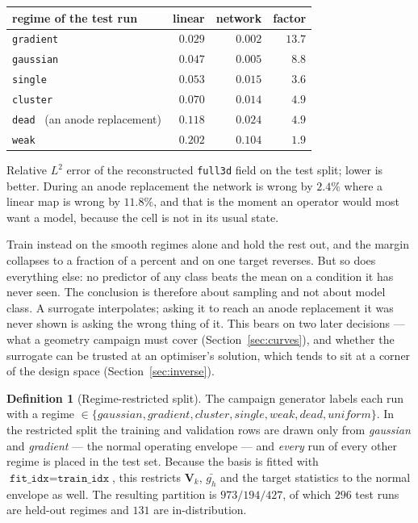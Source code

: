 \documentclass[11pt,a4paper]{article}
\newcommand{\vect}[1]{\mathbf{#1}}
\theoremstyle{plain}
\theoremstyle{definition}
\newtheorem{definition}[proposition]{Definition}
\theoremstyle{remark}
\begin{document}
\begin{center}
\small
\begin{tabular}{@{}lrrr@{}}
\toprule
regime of the test run & linear & network & factor \\
\midrule
\texttt{gradient}                     & $0.029$ & $0.002$ & $13.7$ \\
\texttt{gaussian}                     & $0.047$ & $0.005$ & $8.8$ \\
\texttt{single}                       & $0.053$ & $0.015$ & $3.6$ \\
\texttt{cluster}                      & $0.070$ & $0.014$ & $4.9$ \\
\texttt{dead} \ (an anode replacement) & $0.118$ & $0.024$ & $4.9$ \\
\texttt{weak}                         & $0.202$ & $0.104$ & $1.9$ \\
\bottomrule
\end{tabular}
\end{center}

\noindent
Relative $L^2$ error of the reconstructed \texttt{full3d} field on the test
split; lower is better. During an anode replacement the network is wrong by
$2.4\%$ where a linear map is wrong by $11.8\%$, and that is the moment an
operator would most want a model, because the cell is not in its usual state.

Train instead on the smooth regimes alone and hold the rest out, and the margin
collapses to a fraction of a percent and on one target reverses. But so does
everything else: no predictor of any class beats the mean on a condition it has
never seen. The conclusion is therefore about sampling and not about model
class. A surrogate interpolates; asking it to reach an anode replacement it was
never shown is asking the wrong thing of it. This bears on two later decisions
--- what a geometry campaign must cover (Section~\ref{sec:curves}), and whether
the surrogate can be trusted at an optimiser's solution, which tends to sit at a
corner of the design space (Section~\ref{sec:inverse}).

\begin{definition}[Regime-restricted split]
\label{def:restricted}
The campaign generator labels each run with a regime
$\in\{\textit{gaussian},\textit{gradient},\textit{cluster},\textit{single},
\textit{weak},\textit{dead},\textit{uniform}\}$. In the restricted split the
training and validation rows are drawn only from \textit{gaussian} and
\textit{gradient} --- the normal operating envelope --- and \emph{every} run of
every other regime is placed in the test set. Because the basis is fitted with
$\texttt{fit\_idx}=\texttt{train\_idx}$, this restricts $\vect{V}_k$,
$\bar{g_h}$ and the target statistics to the normal envelope as well. The
resulting partition is $973/194/427$, of which $296$ test runs are held-out
regimes and $131$ are in-distribution.
\end{definition}
\end{document}
